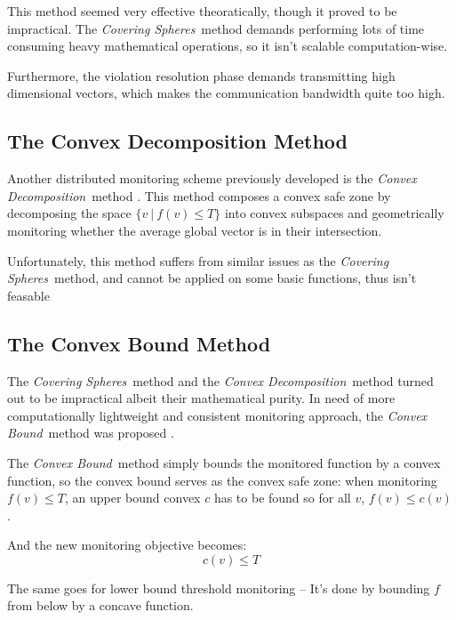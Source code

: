 \documentclass[11pt, conference]{article}
\newcommand{\coveringSpheres}{\textit{Covering Spheres}}
\newcommand{\convexDecomposition}{\textit{Convex Decomposition}}
\newcommand{\convexBound}{\textit{Convex Bound}}
\begin{document}
This method seemed very effective theoratically, though it proved to be impractical. The \coveringSpheres \ method demands performing lots of time consuming heavy mathematical operations, so it isn't scalable computation-wise.

Furthermore, the violation resolution phase demands transmitting high dimensional vectors, which makes the communication bandwidth quite too high.

\subsection{The Convex Decomposition Method}

Another distributed monitoring scheme previously developed is the \convexDecomposition \ method \cite{lazerson2015monitoring}. This method composes a convex safe zone by decomposing the space ${\{v \ | \ f(v) \leq T\}}$ into convex subspaces and geometrically monitoring whether the average global vector is in their intersection.

Unfortunately, this method suffers from similar issues as the \coveringSpheres \ method, and cannot be applied on some basic functions, thus isn't feasable \cite{lazerson2018lightweight}

\subsection{The Convex Bound Method}

The \coveringSpheres \ method and the \convexDecomposition \ method turned out to be impractical albeit their mathematical purity. In need of more computationally lightweight and consistent monitoring approach, the \convexBound \ method was proposed \cite{lazerson2018lightweight}.

The \convexBound \ method simply bounds the monitored function by a convex function, so the convex bound serves as the convex safe zone: when monitoring $f(v) \leq T$, an upper bound convex $c$ has to be found so for all $v$, $f(v) \leq  c(v)$.

And the new monitoring objective becomes:
\begin{equation}
\label{monitoringConstraint}
c(v) \leq T
\end{equation}

The same goes for lower bound threshold monitoring -- It's done by bounding $f$ from below by a concave function.
\end{document}
